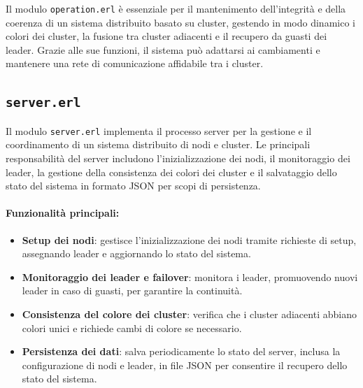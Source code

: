 \documentclass[12pt, a4paper]{report}
\begin{document}
\noindent
Il modulo \texttt{operation.erl} è essenziale per il mantenimento dell'integrità e della coerenza di un sistema distribuito basato su cluster, gestendo in modo dinamico i colori dei cluster, la fusione tra cluster adiacenti e il recupero da guasti dei leader. Grazie alle sue funzioni, il sistema può adattarsi ai cambiamenti e mantenere una rete di comunicazione affidabile tra i cluster.

\subsection{\texttt{server.erl}}

Il modulo \texttt{server.erl} implementa il processo server per la gestione e il coordinamento di un sistema distribuito di nodi e cluster. Le principali responsabilità del server includono l'inizializzazione dei nodi, il monitoraggio dei leader, la gestione della consistenza dei colori dei cluster e il salvataggio dello stato del sistema in formato JSON per scopi di persistenza.

\paragraph{Funzionalità principali:}
\begin{itemize}
    \item \textbf{Setup dei nodi}: gestisce l'inizializzazione dei nodi tramite richieste di setup, assegnando leader e aggiornando lo stato del sistema.
    \item \textbf{Monitoraggio dei leader e failover}: monitora i leader, promuovendo nuovi leader in caso di guasti, per garantire la continuità.
    \item \textbf{Consistenza del colore dei cluster}: verifica che i cluster adiacenti abbiano colori unici e richiede cambi di colore se necessario.
    \item \textbf{Persistenza dei dati}: salva periodicamente lo stato del server, inclusa la configurazione di nodi e leader, in file JSON per consentire il recupero dello stato del sistema.
\end{itemize}
\end{document}
